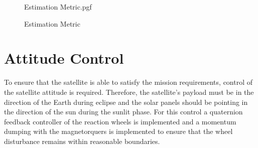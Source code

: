 \begin{figure}[!htb]
	\centering
	\def\pgfwidth{10cm}
	{Estimation Metric.pgf}
	
	\caption{Estimation Metric}
	\label{fig:Estimation Metric}
\end{figure}


\section{Attitude Control}
To ensure that the satellite is able to satisfy the mission requirements, control of the satellite attitude is required. Therefore, the satellite's payload must be in the direction of the Earth during eclipse and the solar panels should be pointing in the direction of the sun during the sunlit phase. For this control a quaternion feedback controller of the reaction wheels is implemented and a momentum dumping with the magnetorquers is implemented to ensure that the wheel disturbance remains within reasonable boundaries.

